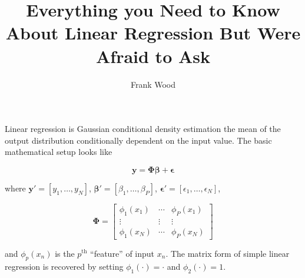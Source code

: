 \documentclass[11pt]{amsart}
\title{Everything you Need to Know About Linear Regression But Were Afraid to Ask}
\author{Frank Wood}
\newcommand{\vy}{\ensuremath{\mathbf{y}}}
\newcommand{\vbeta}{\ensuremath{\boldsymbol{\beta}}}
\newcommand{\mPhi}{\ensuremath{\boldsymbol{\Phi}}}
\newcommand{\vepsilon}{\ensuremath{\boldsymbol{\epsilon}}}
\newcommand{\tth}{\ensuremath{^{\mathrm{th}}}}
\begin{document}
\maketitle

Linear regression is Gaussian conditional density estimation the mean of the output distribution conditionally dependent on the input value.  The basic mathematical setup looks like

\begin{equation}
\vy = \mPhi \vbeta + \vepsilon
\end{equation}

where $\vy' = [y_1, \ldots, y_N]$, $\vbeta' = [\beta_1, \ldots, \beta_P]$, $\vepsilon' = [\epsilon_1, \ldots, \epsilon_N]$,  

\[\mPhi = \left[
\begin{array}{ccc}
 \phi_1(x_1) & \cdots  &  \phi_P(x_1)  \\
 \vdots & \vdots  &  \vdots \\
\phi_1(x_N)  & \cdots  &   \phi_P(x_N)
\end{array}
\right]\]

and $\phi_p(x_n)$ is the $p\tth$ ``feature'' of input $x_n$.  The matrix form of simple linear regression is recovered by setting $\phi_1(\cdot) = \cdot$ and $\phi_2(\cdot) = 1$. 
\end{document}
